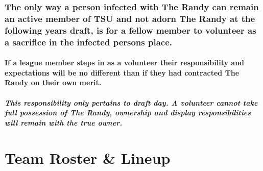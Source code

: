 \documentclass[]{book}
\let\oldparagraph\paragraph
\renewcommand{\paragraph}[1]{\oldparagraph{#1}\mbox{}}
\begin{document}
\hypertarget{the-only-way-a-person-infected-with-the-randy-can-remain-an-active-member-of-tsu-and-not-adorn-the-randy-at-the-following-years-draft-is-for-a-fellow-member-to-volunteer-as-a-sacrifice-in-the-infected-persons-place.}{%
\subsection{The only way a person infected with The Randy can remain an active member of TSU and not adorn The Randy at the following years draft, is for a fellow member to volunteer as a sacrifice in the infected persons place.}\label{the-only-way-a-person-infected-with-the-randy-can-remain-an-active-member-of-tsu-and-not-adorn-the-randy-at-the-following-years-draft-is-for-a-fellow-member-to-volunteer-as-a-sacrifice-in-the-infected-persons-place.}}

\hypertarget{if-a-league-member-steps-in-as-a-volunteer-their-responsibility-and-expectations-will-be-no-different-than-if-they-had-contracted-the-randy-on-their-own-merit.}{%
\subsubsection{If a league member steps in as a volunteer their responsibility and expectations will be no different than if they had contracted The Randy on their own merit.}\label{if-a-league-member-steps-in-as-a-volunteer-their-responsibility-and-expectations-will-be-no-different-than-if-they-had-contracted-the-randy-on-their-own-merit.}}

\hypertarget{this-responsibility-only-pertains-to-draft-day.-a-volunteer-cannot-take-full-possession-of-the-randy-ownership-and-display-responsibilities-will-remain-with-the-true-owner.}{%
\paragraph{This responsibility only pertains to draft day. A volunteer cannot take full possession of The Randy, ownership and display responsibilities will remain with the true owner.}\label{this-responsibility-only-pertains-to-draft-day.-a-volunteer-cannot-take-full-possession-of-the-randy-ownership-and-display-responsibilities-will-remain-with-the-true-owner.}}

\hypertarget{team-roster-lineup}{%
\chapter{Team Roster \& Lineup}\label{team-roster-lineup}}
\end{document}
